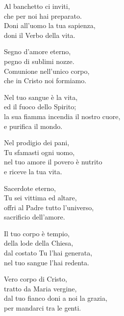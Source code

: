 \strofa Al banchetto ci inviti,\\
che per noi hai preparato.\\
Doni all'uomo la tua sapienza,\\
doni il Verbo della vita.

\spazio

\strofa Segno d'amore eterno,\\
pegno di sublimi nozze.\\
Comunione nell'unico corpo,\\
che in Cristo noi formiamo.

\spazio


\spazio

\strofa Nel tuo sangue è la vita,\\
ed il fuoco dello Spirito;\\
la sua fiamma incendia il nostro cuore,\\
e purifica il mondo.

\spazio

\strofa Nel prodigio dei pani,\\
Tu sfamasti ogni uomo,\\
nel tuo amore il povero è nutrito\\
e riceve la tua vita.

\spazio


\spazio

\strofa Sacerdote eterno,\\
Tu sei vittima ed altare,\\
offri al Padre tutto l'universo,\\
sacrificio dell'amore.

\spazio

\strofa Il tuo corpo è tempio,\\
della lode della Chiesa,\\
dal costato Tu l'hai generata,\\
nel tuo sangue l'hai redenta.

\spazio


\spazio

\strofa Vero corpo di Cristo,\\
tratto da Maria vergine,\\
dal tuo fianco doni a noi la grazia,\\
per mandarci tra le genti.

